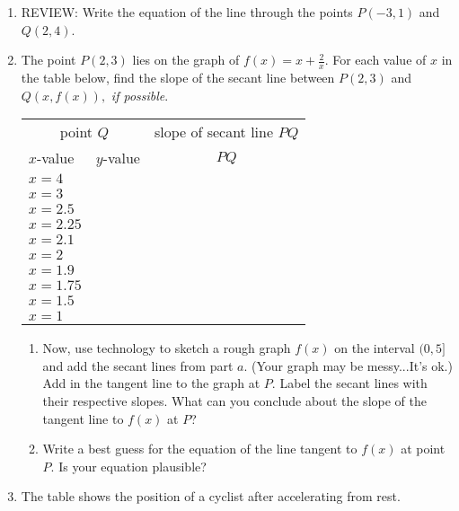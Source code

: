 \documentclass[11pt,fleqn]{article}
\begin{document}
\begin{enumerate}
\item REVIEW: Write the equation of the line through the points $P(-3,1)$ and $Q(2,4)$.
\vspace{1.5in}
\item The point $P(2,3)$ lies on the graph of $f(x)=x+\frac{2}{x}.$ For each value of $x$ in the table below, find the slope of the secant line between $P(2,3)$ and $Q(x,f(x)),$ \emph{if possible}.\\
		{\LARGE{\begin{center}
		\begin{tabular}{l | l | c}
		\multicolumn{2}{c}{point $Q$}& slope of secant line $PQ$\\
		$x$-value&\quad$y$-value \quad \quad& $PQ$\\
		\hline
		$x=4$&&\\
		\hline
		$x=3$&&\\
		\hline
		$x=2.5$&&\\
		\hline
		$x=2.25$&&\\
		\hline
		$x=2.1$&&\\
		\hline
		$x=2$&&\\
		\hline
		$x=1.9$&&\\
		\hline
		$x=1.75$&&\\
		\hline
		$x=1.5$&&\\
		\hline
		$x=1$&&\\
		\hline
		\end{tabular}
		\end{center}}}
		\newpage
	\begin{enumerate}
	\item  Now, use technology to sketch a rough graph $f(x)$ on the interval $(0,5]$ and add the secant lines from part $a$. (Your graph may be messy...It's ok.) Add in the tangent line to the graph at $P.$ Label the secant lines with their respective slopes. What can you conclude about the slope of the tangent line to $f(x)$ at $P$?
	\vfill
	\item Write a best guess for the equation of the line tangent to $f(x)$ at point $P$. Is your equation plausible?
	\vspace{1.5in}
	
	\end{enumerate}
	\newpage

\item The table shows the position of a cyclist after accelerating from rest.\\


\end{enumerate}
\end{document}
